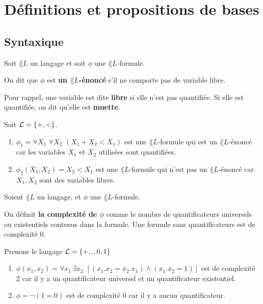 \documentclass[a4paper, 12pt]{report}
\begin{document}
\chapter{Définitions et propositions de bases}

\section{Syntaxique}

\begin{definition} 
	Soit $\lang{L}$ un langage et soit $\phi$ une $\lang{L}$-formule.

	On dit que $\phi$ est \textbf{un $\lang{L}$-énoncé} s'il ne comporte pas de
	variable libre.

	Pour rappel, une variable est dite \textbf{libre} si elle n'est pas
	quantifiée. Si elle est quantifiée, on dit qu'elle est \textbf{muette}.
\end{definition}

\begin{exemple}
	Soit $\mathcal{L} = \left\{ +, < \right\}$.

	\begin{enumerate}
		\item $\phi_{1} = \forall X_{1} \, \, \forall X_{2} \, \, (X_{1} + X_{2} <
			X_{1})$ est une $\lang{L}$-formule qui est un
			$\lang{L}$-énoncé car les variables $X_{1}$ et $X_{2}$ utilisées
			sont quantifiées.
		\item $\phi_{2}(X_{1}, X_{2}) = X_{2} < X_{1}$ est une
			$\lang{L}$-formule qui n'est pas un $\lang{L}$-énoncé car $X_{1}, X_{2}$
			sont des variables libres.
	\end{enumerate}
\end{exemple}

\begin{definition} 
	Soient $\lang{L}$ un langage, et $\phi$ une $\lang{L}$-formule.

	On définit \textbf{la complexité de $\phi$} comme le nombre de
	quantificateurs universels ou existentiels contenus dans la formule.  Une
	formule sans quantificateurs est de complexité $0$.
\end{definition}

\begin{exemple}
	Prenons le langage $\mathcal{L} = \left\{ +, ., 0, 1 \right\}$
	\begin{enumerate}
		\item $\phi(x_{1}, x_{2}) = \forall x_{1} \, \exists x_{2} \, \, [(x_{1} .
		x_{2} = x_{2} . x_{1}) \wedge (x_{1} . x_{2} = 1)]$ est de complexité
			$2$ car il y a un quantificateur universel et un quantificateur existentiel.
		\item $\phi = \neg (1 = 0)$ est de complexité $0$ car il y a aucun
			quantificateur.
	\end{enumerate}
\end{exemple}
\end{document}
